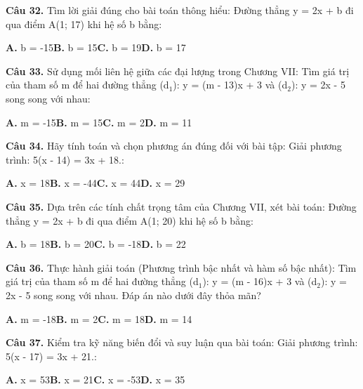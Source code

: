 \documentclass[11pt,a4paper]{article}
\begin{document}
\textbf{\color{primary} Câu 32.} Tìm lời giải đúng cho bài toán thông hiểu: Đường thẳng y = 2x + b đi qua điểm A(1; 17) khi hệ số b bằng:\par
\hspace*{1.5em}\textbf{A.} b = -15\quad\quad \textbf{B.} b = 15\quad\quad \textbf{C.} b = 19\quad\quad \textbf{D.} b = 17\par\vspace{2pt}
\textbf{\color{primary} Câu 33.} Sử dụng mối liên hệ giữa các đại lượng trong Chương VII: Tìm giá trị của tham số m để hai đường thẳng (d$_1$): y = (m - 13)x + 3 và (d$_2$): y = 2x - 5 song song với nhau:\par
\hspace*{1.5em}\textbf{A.} m = -15\quad\quad \textbf{B.} m = 15\quad\quad \textbf{C.} m = 2\quad\quad \textbf{D.} m = 11\par\vspace{2pt}
\textbf{\color{primary} Câu 34.} Hãy tính toán và chọn phương án đúng đối với bài tập: Giải phương trình: 5(x - 14) = 3x + 18.:\par
\hspace*{1.5em}\textbf{A.} x = 18\quad\quad \textbf{B.} x = -44\quad\quad \textbf{C.} x = 44\quad\quad \textbf{D.} x = 29\par\vspace{2pt}
\textbf{\color{primary} Câu 35.} Dựa trên các tính chất trọng tâm của Chương VII, xét bài toán: Đường thẳng y = 2x + b đi qua điểm A(1; 20) khi hệ số b bằng:\par
\hspace*{1.5em}\textbf{A.} b = 18\quad\quad \textbf{B.} b = 20\quad\quad \textbf{C.} b = -18\quad\quad \textbf{D.} b = 22\par\vspace{2pt}
\textbf{\color{primary} Câu 36.} Thực hành giải toán (Phương trình bậc nhất và hàm số bậc nhất): Tìm giá trị của tham số m để hai đường thẳng (d$_1$): y = (m - 16)x + 3 và (d$_2$): y = 2x - 5 song song với nhau. Đáp án nào dưới đây thỏa mãn?\par
\hspace*{1.5em}\textbf{A.} m = -18\quad\quad \textbf{B.} m = 2\quad\quad \textbf{C.} m = 18\quad\quad \textbf{D.} m = 14\par\vspace{2pt}
\textbf{\color{primary} Câu 37.} Kiểm tra kỹ năng biến đổi và suy luận qua bài toán: Giải phương trình: 5(x - 17) = 3x + 21.:\par
\hspace*{1.5em}\textbf{A.} x = 53\quad\quad \textbf{B.} x = 21\quad\quad \textbf{C.} x = -53\quad\quad \textbf{D.} x = 35\par\vspace{2pt}
\end{document}
